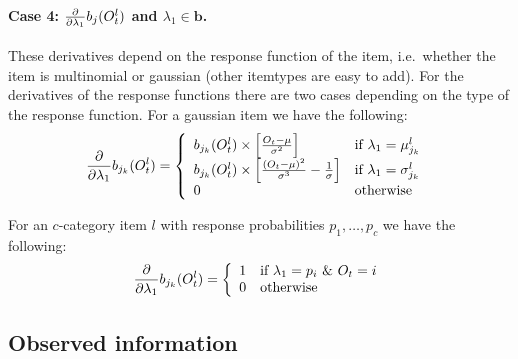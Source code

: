 \documentclass[a4paper,man,nobf]{apa}
\newcommand{\vc}{\mathbf}
\begin{document}
\paragraph{Case 4: $\frac{\partial} {\partial \lambda_{1}} b_{j}({O}_{t}^{l})$ and $\lambda_{1} \in 
\vc{b}$.}  These derivatives depend on the response function of the 
item, i.e.\ whether the item is multinomial or gaussian (other 
itemtypes are easy to add). For the derivatives of the response 
functions there are two cases depending on the type of the response 
function. For a gaussian item we have the following:
\begin{align} 
        \frac{\partial} {\partial \lambda_{1}} b_{j_{k}}(O_{t}^{l})= \left\{ 
	\begin{array}{ll} 
		b_{j_{k}}(O_{t}^{l}) \times  \left[  \frac{O_{t}-\mu}{\sigma^{2}}  
\right] & 
			\mbox{if $\lambda_{1} = \mu_{j_{k}}^{l} $ }  \\ 
            	b_{j_{k}}(O_{t}^{l}) \times \left[  
\frac{(O_{t}-\mu)^{2}}{\sigma^{3}} - \frac{1}{\sigma} \right] & 
			\mbox{if $\lambda_{1} = \sigma_{j_{k}}^{l} $} \\
		0 & \mbox{otherwise} 
            \end{array} \right. 
\end{align}
		
For an $c$-category item $l$ with response probabilities $p_{1}, 
\ldots, p_{c}$ we have the following:
\begin{align} 
        \frac{\partial} {\partial \lambda_{1}} b_{j_{k}}(O_{t}^{l})= \left\{ 
	\begin{array}{ll} 
		1 & \mbox{if $\lambda_{1} = p_{i}$ \& $O_{t}=i$}  \\ 
		0 & \mbox{otherwise} 
            \end{array} \right. 
\end{align}


\subsection{Observed information}

\newcommand{\fpt}{\frac{\partial}{\partial \lambda_{2}} }

\newcommand{\fps}{\frac{\partial^{2}}{\partial\lambda_{1}\partial\lambda_{2}}}
\end{document}
